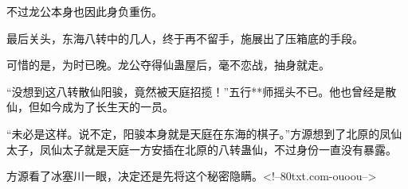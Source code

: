 \begin{this_body}
不过龙公本身也因此身负重伤。

最后关头，东海八转中的几人，终于再不留手，施展出了压箱底的手段。

可惜的是，为时已晚。龙公夺得仙蛊屋后，毫不恋战，抽身就走。

“没想到这八转散仙阳骏，竟然被天庭招揽！”五行**师摇头不已。他也曾经是散仙，但如今成为了长生天的一员。

“未必是这样。说不定，阳骏本身就是天庭在东海的棋子。”方源想到了北原的凤仙太子，凤仙太子就是天庭一方安插在北原的八转蛊仙，不过身份一直没有暴露。

方源看了冰塞川一眼，决定还是先将这个秘密隐瞒。<!--80txt.com-ouoou-->

\end{this_body}

